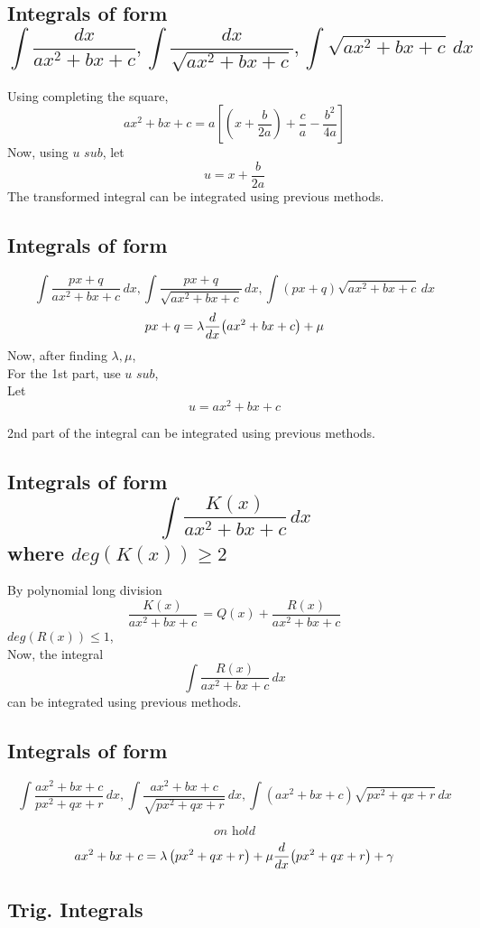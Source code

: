 \documentclass{article}
\begin{document}
\subsection{Integrals of form $$\int \dfrac{dx}{ax^2+bx+c}, \int \dfrac{dx}{\sqrt{ax^2+bx+c}}, \int \sqrt{ax^2+bx+c} \, dx$$}
Using completing the square, $$ax^2+bx+c=a \left[\left(x+\dfrac{b}{2a}\right)+\dfrac{c}{a}-\dfrac{b^2}{4a}\right]$$
Now, using $\textit{u sub}$, let $$u=x+\dfrac{b}{2a}$$
The transformed integral can be integrated using previous methods.

\subsection{Integrals of form}
$$\int \dfrac{px+q}{ax^2+bx+c} \, dx, \int \dfrac{px+q}{\sqrt{ax^2+bx+c}} \, dx, \int \left(px+q\right)\sqrt{ax^2+bx+c} \, dx $$
$$px+q=\lambda \dv{x}(ax^2+bx+c) +\mu$$
Now, after finding $\lambda
    , \mu$, \\For the 1st part, use $\textit{u sub}$,\\ Let $$u= ax^2+bx+c$$

2nd part of the integral can be integrated using previous methods.
\subsection{Integrals of form $$\int \dfrac{K(x)}{ax^2+bx+c} \, dx$$ where $deg(K(x))\ge2$}

By polynomial long division $$\dfrac{K(x)}{ax^2+bx+c} \,=Q(x) + \dfrac{R(x)}{ax^2+bx+c}$$
$deg(R(x))\le 1$,
\\ Now, the integral $$\int \dfrac{R(x)}{ax^2+bx+c} \, dx$$
can be integrated using previous methods.

\subsection{Integrals of form}
$$\int \dfrac{ax^2+bx+c}{px^2+qx+r} \, dx, \int \dfrac{ax^2+bx+c}{\sqrt{px^2+qx+r}} \, dx, \int \left(ax^2+bx+c\right)\sqrt{px^2+qx+r} \, dx$$

$$\textit{on hold}$$
$$ax^2+bx+c= \lambda \left(px^2+qx+r\right)+\mu \dv{x}(px^2+qx+r)+\gamma$$
\subsection{Trig. Integrals}
\end{document}
